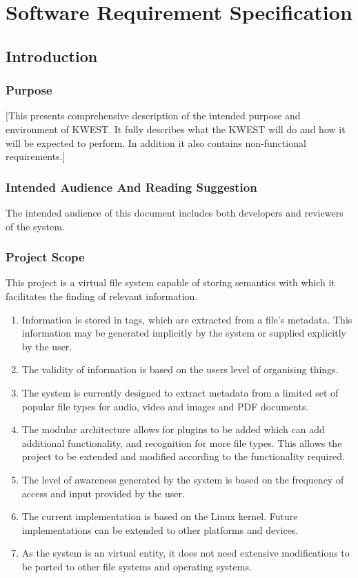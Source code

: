 \chapter{Software Requirement Specification}
\section{Introduction}
\subsection{ Purpose}

[This presents comprehensive description of the intended purpose and environment of KWEST. It fully describes what the KWEST will do and how it will be expected to perform. In addition it also contains non-functional requirements.]

\subsection{ Intended Audience And Reading Suggestion}
The intended audience of this document includes both developers and reviewers of the system.

\subsection{Project Scope}
This project is a virtual file system capable of storing semantics with which it facilitates the finding of relevant information.
\begin{enumerate}
\item  Information is stored in tags, which are extracted from a file's metadata. This
information may be generated implicitly by the system or supplied explicitly by the
user.
\item  The validity of information is based on the users level of organising things.
\item  The system is currently designed to extract metadata from a limited set of popular
file types for audio, video and images and PDF documents.
\item  The modular architecture allows for plugins to be added which can add additional
functionality, and recognition for more file types. This allows the project to be
extended and modified according to the functionality required.
\item  The level of awareness generated by the system is based on the frequency of access
and input provided by the user.
\item  The current implementation is based on the Linux kernel. Future implementations
can be extended to other platforms and devices.
\item  As the system is an virtual entity, it does not need extensive modifications to be
ported to other file systems and operating systems.

\end{enumerate}

